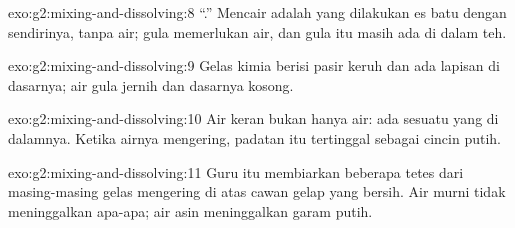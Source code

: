 \begin{solution}{exo:g2:mixing-and-dissolving:8}
``.'' Mencair adalah yang dilakukan es batu dengan sendirinya,
tanpa air; gula memerlukan air, dan gula itu masih ada di dalam teh.
\end{solution}

\begin{solution}{exo:g2:mixing-and-dissolving:9}
Gelas kimia berisi pasir keruh dan ada lapisan di dasarnya; air gula
jernih dan dasarnya kosong.
\end{solution}

\begin{solution}{exo:g2:mixing-and-dissolving:10}
Air keran bukan hanya air: ada sesuatu yang  di dalamnya. Ketika
airnya mengering, padatan itu tertinggal sebagai cincin putih.
\end{solution}

\begin{solution}{exo:g2:mixing-and-dissolving:11}
Guru itu membiarkan beberapa tetes dari masing-masing gelas mengering
di atas cawan gelap yang bersih. Air murni tidak meninggalkan apa-apa;
air asin meninggalkan garam putih.
\end{solution}
